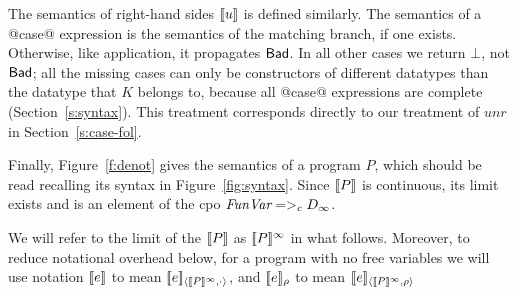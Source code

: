 The semantics of right-hand sides $[\![u]\!]$ is defined similarly.  The
semantics of a @case@ expression is the semantics of the matching branch,
if one exists. Otherwise, like application, it propagates $\mathsf{Bad}$.
In all other cases we return $\bot$, not $\mathsf{Bad}$;
all the missing cases can only be constructors
of different datatypes than the datatype that $K$ belongs to, because
all @case@ expressions are complete (Section~\ref{s:syntax}).
This treatment corresponds directly to our treatment of $unr$ in Section~\ref{s:case-fol}.

Finally, Figure~\ref{f:denot} gives the semantics of a program $P$, which should
be read recalling its syntax in Figure~\ref{fig:syntax}.
Since $[\![P]\!]$ is continuous, its limit exists and is an element of the
cpo $\textit{FunVar} =>_c D_{\infty}$.

\begin{definition}\label{def:abbreviation}
We will refer to the limit of the $[\![P]\!]$ as $[\![P]\!]^{\infty}$ in what follows.
Moreover, to reduce notational overhead below, for a program with no free variables we
will use notation $[\![e]\!]$ to mean $[\![e]\!]_{\langle {[\![P]\!]^\infty},{\cdot}\rangle}$, and
$[\![e]\!]_\rho$ to mean $[\![e]\!]_{\langle {[\![P]\!]^\infty},{\rho}\rangle}$
\end{definition}

